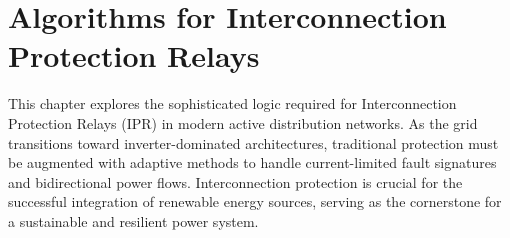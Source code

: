 \chapter{Algorithms for Interconnection Protection Relays}\label{ch_3}

This chapter explores the sophisticated logic required for Interconnection Protection Relays (IPR) in modern active distribution networks. As the grid transitions toward inverter-dominated architectures, traditional protection must be augmented with adaptive methods to handle current-limited fault signatures and bidirectional power flows. Interconnection protection is crucial for the successful integration of renewable energy sources, serving as the cornerstone for a sustainable and resilient power system.




